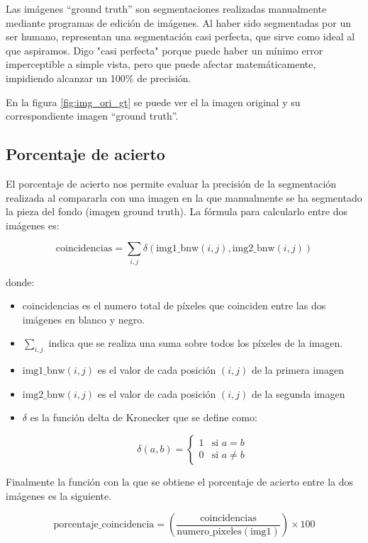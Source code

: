 Las imágenes ``ground truth'' son segmentaciones realizadas manualmente mediante programas de edición de imágenes. Al haber sido segmentadas por un ser humano, representan una segmentación casi perfecta, que sirve como ideal al que aspiramos. Digo "casi perfecta" porque puede haber un mínimo error imperceptible a simple vista, pero que puede afectar matemáticamente, impidiendo alcanzar un 100\% de precisión.

En la figura \ref{fig:img_ori_gt} se puede ver el la imagen original y su correspondiente imagen ``ground truth''.

\subsection{Porcentaje de acierto}\label{porcentaje-de-acierto}

El porcentaje de acierto nos permite evaluar la precisión de la segmentación realizada al compararla con una imagen en la que manualmente se ha segmentado la pieza del fondo (imagen ground truth). La fórmula para calcularlo entre dos imágenes es:

$$\text{coincidencias} = \sum_{i,j} \delta(\text{img1\_bnw}(i,j), \text{img2\_bnw}(i,j))$$

donde:

\begin{itemize}
\setlength{\itemsep}{-1ex}
    \item{\begin{flushleft}  $\text{coincidencias}$ es el numero total de píxeles que coinciden entre las dos imágenes en blanco y negro. \end{flushleft}}
    \item{\begin{flushleft} $\sum_{i,j}$ indica que se realiza una suma sobre todos los píxeles de la imagen. \end{flushleft}}
    \item{\begin{flushleft} $\text{img1\_bnw}(i,j)$ es el valor de cada posición $(i,j)$ de la primera imagen \end{flushleft}}
    \item{\begin{flushleft} $\text{img2\_bnw}(i,j)$ es el valor de cada posición $(i,j)$ de la segunda imagen \end{flushleft}}
    \item{\begin{flushleft} $\delta$ es la función delta de Kronecker que se define como:

    $$\delta(a, b) = 
    \begin{cases} 
    1 & \text{si } a = b \\
    0 & \text{si } a \neq b 
    \end{cases}$$
    \end{flushleft}}
\end{itemize}

Finalmente la función con la que se obtiene el porcentaje de acierto entre la dos imágenes es la siguiente.

$$\text{porcentaje\_coincidencia} = \left( \frac{\text{coincidencias}}{\text{numero\_pixeles}(\text{img1})} \right) \times 100$$

